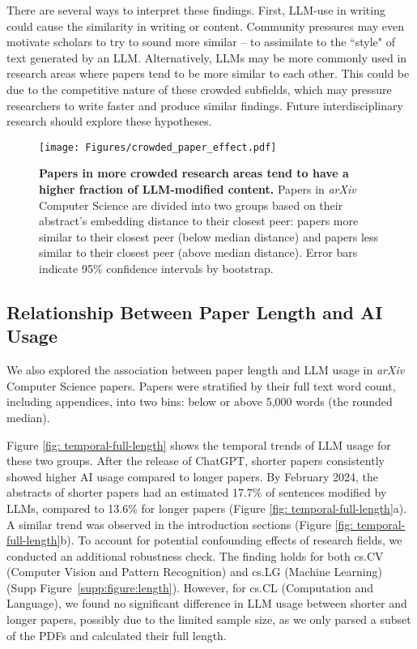 \documentclass{article}
\begin{document}
There are several ways to interpret these findings. First, LLM-use in writing could cause the similarity in writing or content. Community pressures may even motivate scholars to try to sound more similar -- to assimilate to the ``style" of text generated by an LLM.
Alternatively,  LLMs may be more commonly used in research areas where papers tend to be more similar to each other. This could be due to the competitive nature of these crowded subfields, which may pressure researchers to write faster and produce similar findings. Future interdisciplinary research should explore these hypotheses. 



\begin{figure}[htb]
\centering
\texttt{[image: Figures/crowded\_paper\_effect.pdf]}
\caption{
\textbf{Papers in more crowded research areas tend to have a higher fraction of LLM-modified content.}
Papers in \textit{arXiv} Computer Science are divided into two groups based on their abstract's embedding distance to their closest peer: papers more similar to their closest peer (below median distance) and papers less similar to their closest peer (above median distance). Error bars indicate 95\% confidence intervals by bootstrap.
}
\label{fig: homogenization}
\end{figure}


\subsection{Relationship Between Paper Length and AI Usage}
\label{subsec:length}

We also explored the association between paper length and LLM usage in \textit{arXiv} Computer Science papers. Papers were stratified by their full text word count, including appendices, into two bins: below or above 5,000 words (the rounded median).


Figure \ref{fig: temporal-full-length} shows the temporal trends of LLM usage for these two groups. After the release of ChatGPT, shorter papers consistently showed higher AI usage compared to longer papers. By February 2024, the abstracts of shorter papers had an estimated 17.7\% of sentences modified by LLMs, compared to 13.6\% for longer papers (Figure \ref{fig: temporal-full-length}a). A similar trend was observed in the introduction sections (Figure \ref{fig: temporal-full-length}b). 
To account for potential confounding effects of research fields, we conducted an additional robustness check. The finding holds for both cs.CV (Computer Vision and Pattern Recognition) and cs.LG (Machine Learning) (Supp Figure~\ref{supp:figure:length}). However, for cs.CL (Computation and Language), we found no significant difference in LLM usage between shorter and longer papers, possibly due to the limited sample size, as we only parsed a subset of the PDFs and calculated their full length.
\end{document}
